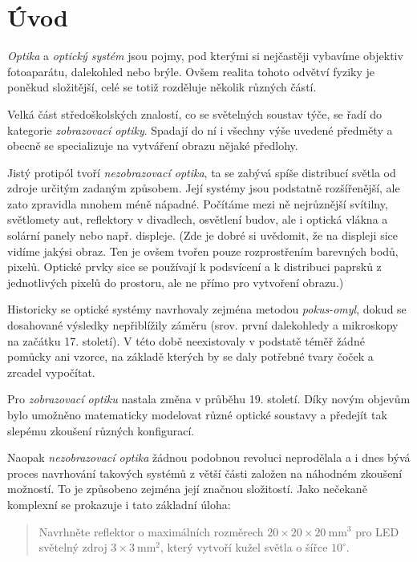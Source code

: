 \chapter{Úvod}

\emph{Optika} a \emph{optický systém} jsou pojmy, pod kterými si nejčastěji vybavíme objektiv fotoaparátu, dalekohled nebo brýle. Ovšem realita tohoto odvětví fyziky je poněkud složitější, celé se totiž rozděluje několik různých částí.

Velká část středoškolských znalostí, co se světelných soustav týče, se řadí do kategorie \emph{zobrazovací optiky}. Spadají do ní i všechny výše uvedené předměty a obecně se specializuje na vytváření obrazu nějaké předlohy.

Jistý protipól tvoří \emph{nezobrazovací optika}, ta se zabývá spíše distribucí světla od zdroje určitým zadaným způsobem. Její systémy jsou podstatně rozšířenější, ale zato zpravidla mnohem méně nápadné. Počítáme mezi ně nejrůznější svítilny, světlomety aut, reflektory v divadlech, osvětlení budov, ale i optická vlákna a solární panely nebo např. displeje. (Zde je dobré si uvědomit, že na displeji sice vidíme jakýsi obraz. Ten je ovšem tvořen pouze rozprostřením barevných bodů, pixelů. Optické prvky sice se používají k podsvícení a k distribuci paprsků z jednotlivých pixelů do prostoru, ale ne přímo pro vytvoření obrazu.)

Historicky se optické systémy navrhovaly zejména metodou \emph{pokus-omyl}, dokud se dosahované výsledky nepřiblížily záměru (srov. první dalekohledy a mikroskopy na začátku 17. století). V této době neexistovaly v podstatě téměř žádné pomůcky ani vzorce, na základě kterých by se daly potřebné tvary čoček a zrcadel vypočítat. 

Pro \emph{zobrazovací optiku} nastala změna v průběhu 19. století. Díky novým objevům bylo umožněno matematicky modelovat různé optické soustavy a předejít tak slepému zkoušení různých konfigurací.\src

Naopak \emph{nezobrazovací optika} žádnou podobnou revoluci neprodělala a i dnes bývá proces navrhování takových systémů z větší části založen na náhodném zkoušení možností. To je způsobeno zejména její značnou složitostí. Jako nečekaně komplexní se prokazuje i tato základní úloha:

\begin{quote}
    Navrhněte reflektor o maximálních rozměrech $20\times20\times20\ \mathrm{mm^3}$ pro LED světelný zdroj $3\times3\ \mathrm{mm^2}$, který vytvoří kužel světla o šířce $10^{\circ}$.
\end{quote}

